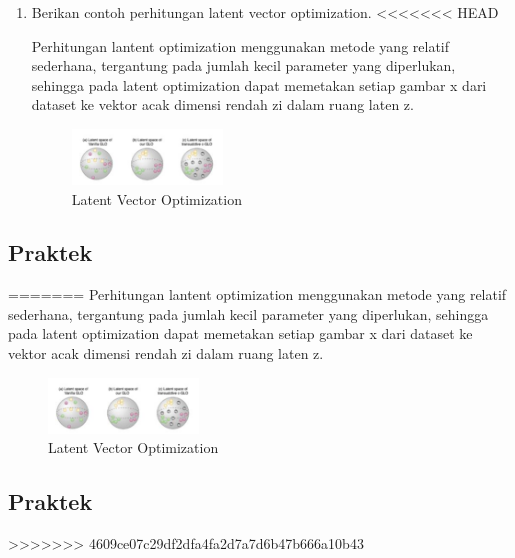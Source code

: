 \begin{enumerate}
        \item Berikan contoh perhitungan latent vector optimization.
<<<<<<< HEAD

		Perhitungan lantent optimization menggunakan metode yang relatif sederhana, tergantung pada jumlah kecil parameter yang diperlukan, sehingga pada latent optimization dapat memetakan setiap gambar x dari dataset ke vektor acak dimensi rendah zi dalam ruang laten z.

		\begin{figure}[H]
			\includegraphics[width=4cm]{figures/1174039/chapter9/teori11.PNG}
            	\centering
           	 \caption{Latent Vector Optimization}
       	 \end{figure}

\end{enumerate}

\subsection{Praktek}
\begin{enumerate}

=======
		Perhitungan lantent optimization menggunakan metode yang relatif sederhana, tergantung pada jumlah kecil parameter yang diperlukan, sehingga pada latent optimization dapat memetakan setiap gambar x dari dataset ke vektor acak dimensi rendah zi dalam ruang laten z.
		\begin{figure}[H]
			\includegraphics[width=4cm]{figures/1174039/chapter9/teori11.PNG}
            	\centering
           	\caption{Latent Vector Optimization}
        \end{figure}
           
\end{enumerate}

\subsection{Praktek}
>>>>>>> 4609ce07c29df2dfa4fa2d7a7d6b47b666a10b43

